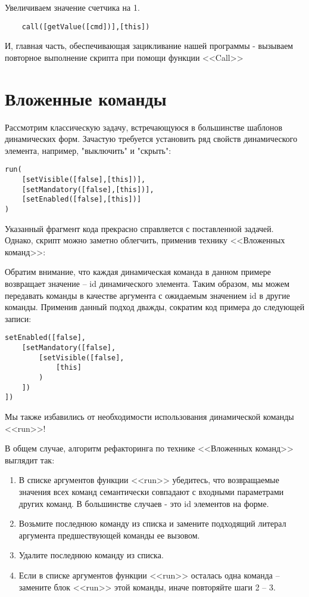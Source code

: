 \documentclass[../index.tex]{subfiles}
\begin{document}
    Увеличиваем значение счетчика на 1.
    
    \begin{verbatim}
    call([getValue([cmd])],[this])
    \end{verbatim}
    
    И, главная часть, обеспечивающая зацикливание нашей программы - вызываем повторное выполнение скрипта при помощи функции
    <<Call>>


\section{Вложенные команды}

Рассмотрим классическую задачу, встречающуюся в большинстве шаблонов динамических форм. Зачастую требуется установить ряд свойств динамического элемента, например, "выключить" и "скрыть":
\begin{verbatim}
run(
    [setVisible([false],[this])],
    [setMandatory([false],[this])],
    [setEnabled([false],[this])]
)
\end{verbatim}

Указанный фрагмент кода прекрасно справляется с поставленной задачей. Однако, скрипт можно заметно облегчить, применив технику <<Вложенных команд>>:

Обратим внимание, что каждая динамическая команда в данном примере возвращает значение -- id динамического элемента. Таким образом, мы можем передавать команды в качестве аргумента с ожидаемым значением id в другие команды. Применив данный подход
дважды, сократим код примера до следующей записи:

\begin{verbatim}
setEnabled([false],
	[setMandatory([false],
		[setVisible([false],
			[this]
		)
	])
])
\end{verbatim}

Мы также избавились от необходимости использования динамической команды <<run>>!

В общем случае, алгоритм рефакторинга по технике <<Вложенных команд>> выглядит так:

\begin{enumerate}
	\item В списке аргументов функции <<run>> убедитесь, что возвращаемые значения всех команд семантически совпадают с входными параметрами других команд. В большинстве случаев - это id элементов на форме.
	\item Возьмите последнюю команду из списка и замените подходящий литерал аргумента предшествующей команды ее вызовом.
	\item Удалите последнюю команду из списка.
	\item Если в списке аргументов функции <<run>> осталась одна команда -- замените блок <<run>> этой команды, иначе повторяйте шаги 2 -- 3.
\end{enumerate}
\end{document}
